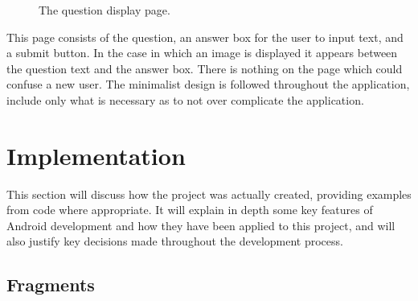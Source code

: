 \documentclass{article}
\begin{document}
\begin{figure}[H]
	\centering
	\caption{The question display page.}
	\label{figure:applicationQuestionPage}
\end{figure}

This page consists of the question, an answer box for the user to input text, and a submit button. In the case in which an image is displayed it appears between the question text and the answer box. There is nothing on the page which could confuse a new user. The minimalist design is followed throughout the application, include only what is necessary as to not over complicate the application. \par

\section{Implementation}
\label{section:implementation}

This section will discuss how the project was actually created, providing examples from code where appropriate. It will explain in depth some key features of Android development and how they have been applied to this project, and will also justify key decisions made throughout the development process. 

\subsection{Fragments}
\end{document}
